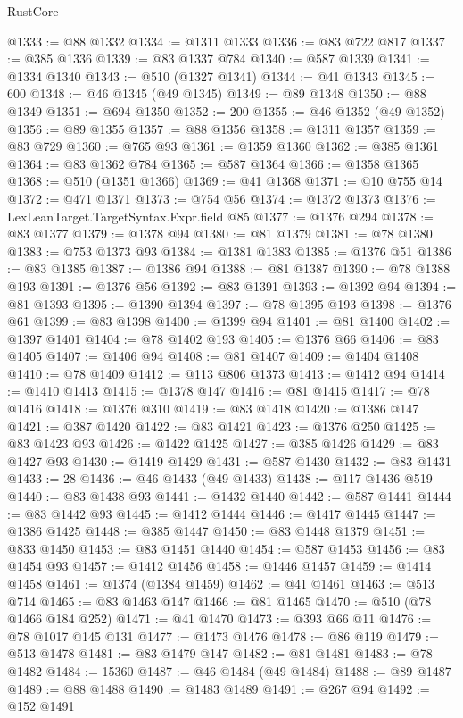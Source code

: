 \begin{lexlean}{RustCore}
\begin{coremodule}
@1333 := @88 @1332
@1334 := @1311 @1333
@1336 := @83 @722 @817
@1337 := @385 @1336
@1339 := @83 @1337 @784
@1340 := @587 @1339
@1341 := @1334 @1340
@1343 := @510 (@1327 @1341)
@1344 := @41 @1343
@1345 := 600
@1348 := @46 @1345 (@49 @1345)
@1349 := @89 @1348
@1350 := @88 @1349
@1351 := @694 @1350
@1352 := 200
@1355 := @46 @1352 (@49 @1352)
@1356 := @89 @1355
@1357 := @88 @1356
@1358 := @1311 @1357
@1359 := @83 @729
@1360 := @765 @93
@1361 := @1359 @1360
@1362 := @385 @1361
@1364 := @83 @1362 @784
@1365 := @587 @1364
@1366 := @1358 @1365
@1368 := @510 (@1351 @1366)
@1369 := @41 @1368
@1371 := @10 @755 @14
@1372 := @471 @1371
@1373 := @754 @56
@1374 := @1372 @1373
@1376 := LexLeanTarget.TargetSyntax.Expr.field @85
@1377 := @1376 @294
@1378 := @83 @1377
@1379 := @1378 @94
@1380 := @81 @1379
@1381 := @78 @1380
@1383 := @753 @1373 @93
@1384 := @1381 @1383
@1385 := @1376 @51
@1386 := @83 @1385
@1387 := @1386 @94
@1388 := @81 @1387
@1390 := @78 @1388 @193
@1391 := @1376 @56
@1392 := @83 @1391
@1393 := @1392 @94
@1394 := @81 @1393
@1395 := @1390 @1394
@1397 := @78 @1395 @193
@1398 := @1376 @61
@1399 := @83 @1398
@1400 := @1399 @94
@1401 := @81 @1400
@1402 := @1397 @1401
@1404 := @78 @1402 @193
@1405 := @1376 @66
@1406 := @83 @1405
@1407 := @1406 @94
@1408 := @81 @1407
@1409 := @1404 @1408
@1410 := @78 @1409
@1412 := @113 @806 @1373
@1413 := @1412 @94
@1414 := @1410 @1413
@1415 := @1378 @147
@1416 := @81 @1415
@1417 := @78 @1416
@1418 := @1376 @310
@1419 := @83 @1418
@1420 := @1386 @147
@1421 := @387 @1420
@1422 := @83 @1421
@1423 := @1376 @250
@1425 := @83 @1423 @93
@1426 := @1422 @1425
@1427 := @385 @1426
@1429 := @83 @1427 @93
@1430 := @1419 @1429
@1431 := @587 @1430
@1432 := @83 @1431
@1433 := 28
@1436 := @46 @1433 (@49 @1433)
@1438 := @117 @1436 @519
@1440 := @83 @1438 @93
@1441 := @1432 @1440
@1442 := @587 @1441
@1444 := @83 @1442 @93
@1445 := @1412 @1444
@1446 := @1417 @1445
@1447 := @1386 @1425
@1448 := @385 @1447
@1450 := @83 @1448 @1379
@1451 := @833 @1450
@1453 := @83 @1451 @1440
@1454 := @587 @1453
@1456 := @83 @1454 @93
@1457 := @1412 @1456
@1458 := @1446 @1457
@1459 := @1414 @1458
@1461 := @1374 (@1384 @1459)
@1462 := @41 @1461
@1463 := @513 @714
@1465 := @83 @1463 @147
@1466 := @81 @1465
@1470 := @510 (@78 @1466 @184 @252)
@1471 := @41 @1470
@1473 := @393 @66 @11
@1476 := @78 @1017 @145 @131
@1477 := @1473 @1476
@1478 := @86 @119
@1479 := @513 @1478
@1481 := @83 @1479 @147
@1482 := @81 @1481
@1483 := @78 @1482
@1484 := 15360
@1487 := @46 @1484 (@49 @1484)
@1488 := @89 @1487
@1489 := @88 @1488
@1490 := @1483 @1489
@1491 := @267 @94
@1492 := @152 @1491

\end{coremodule}
\end{lexlean}

